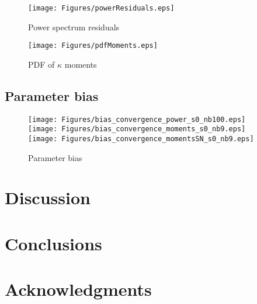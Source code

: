 \documentclass[reprint,aps,prd,superscriptaddress,showkeys,showpacs]{revtex4-1}
\begin{document}
\begin{figure*}
\begin{center}
\texttt{[image: Figures/powerResiduals.eps]}
\end{center}
\caption{Power spectrum residuals}
\label{fig:psResiduals}
\end{figure*}

\begin{figure*}
\begin{center}
\texttt{[image: Figures/pdfMoments.eps]}
\end{center}
\caption{PDF of $\kappa$ moments}
\label{fig:pdfMoments}
\end{figure*} 


\subsection{Parameter bias}

\begin{figure*}
\begin{center}
\texttt{[image: Figures/bias\_convergence\_power\_s0\_nb100.eps]}
\texttt{[image: Figures/bias\_convergence\_moments\_s0\_nb9.eps]}
\texttt{[image: Figures/bias\_convergence\_momentsSN\_s0\_nb9.eps]}
\end{center}
\caption{Parameter bias}
\label{fig:parbias}
\end{figure*}


\section{Discussion}
% 


\section{Conclusions}
% 


\section*{Acknowledgments}





\label{lastpage}
\end{document}
